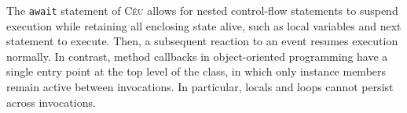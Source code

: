 \documentclass[10pt, conference, compsocconf]{IEEEtran}
\newcommand{\CEU}{\textsc{C\'{e}u}\xspace}
\newcommand{\code}[1] {{\small{\texttt{#1}}}}
\begin{document}
The \code{await} statement of \CEU allows for nested control-flow statements to
suspend execution while retaining all enclosing state alive, such as local
variables and next statement to execute.
Then, a subsequent reaction to an event resumes execution normally.
In contrast, method callbacks in object-oriented programming have a single
entry point at the top level of the class, in which only instance members
remain active between invocations.
In particular, locals and loops cannot persist across invocations.

\end{document}
